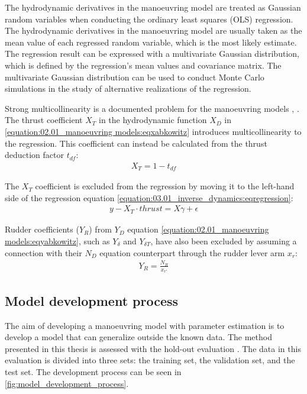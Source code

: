 \noindent The hydrodynamic derivatives in the manoeuvring model are treated as Gaussian random variables when conducting the ordinary least squares (OLS) regression. The hydrodynamic derivatives in the manoeuvring model are usually taken as the mean value of each regressed random variable, which is the most likely estimate. The regression result can be expressed with a multivariate Gaussian distribution, which is defined by the regression’s mean values and covariance matrix. The multivariate Gaussian distribution can be used to conduct Monte Carlo simulations in the study of alternative realizations of the regression.


Strong multicollinearity is a documented problem for the manoeuvring models \cite{luo_parameter_2016}, \cite{wang_quantifying_2018}.
The thrust coefficient \(X_T\) in the hydrodynamic function \(X_D\) in \autoref{equation:02.01_manoeuvring models:eqxabkowitz} introduces multicollinearity to the regression. This coefficient can instead be calculated from the thrust deduction factor \(t_{df}\):
\begin{equation}\label{equation:03.01_inverse_dynamics:eqXthrust}
\begin{split}\displaystyle X_{T} = 1 - t_{df}\end{split}
\end{equation}

\noindent The \(X_T\) coefficient is excluded from the regression by moving it to the left-hand side of the regression equation \autoref{equation:03.01_inverse_dynamics:eqregression}:
\begin{equation}\label{equation:03.01_inverse_dynamics:eqexclude}
\begin{split}y-X_T \cdot thrust = X \gamma + \epsilon\end{split}
\end{equation}

\noindent Rudder coefficients (\(Y_R\)) from \(Y_D\) equation \autoref{equation:02.01_manoeuvring models:eqyabkowitz}, such as \(Y_{\delta}\) and \(Y_{\delta T}\), have also been excluded by assuming a connection with their \(N_D\) equation counterpart through the rudder lever arm \(x_r\):
\begin{equation}\label{equation:03.01_inverse_dynamics:eqyr}
\begin{split}\displaystyle Y_{R} = \frac{N_{R}}{x_{r'}}\end{split}
\end{equation}

\subsection{Model development process}
\label{sec:model_development_process}
The aim of developing a manoeuvring model with parameter estimation is to develop a model that can generalize outside the known data. The method presented in this thesis is assessed with the hold-out evaluation \cite{sammut_holdout_2017}. The data in this evaluation is divided into three sets: the training set, the validation set, and the test set. The development process can be seen in \autoref{fig:model_development_process}.


